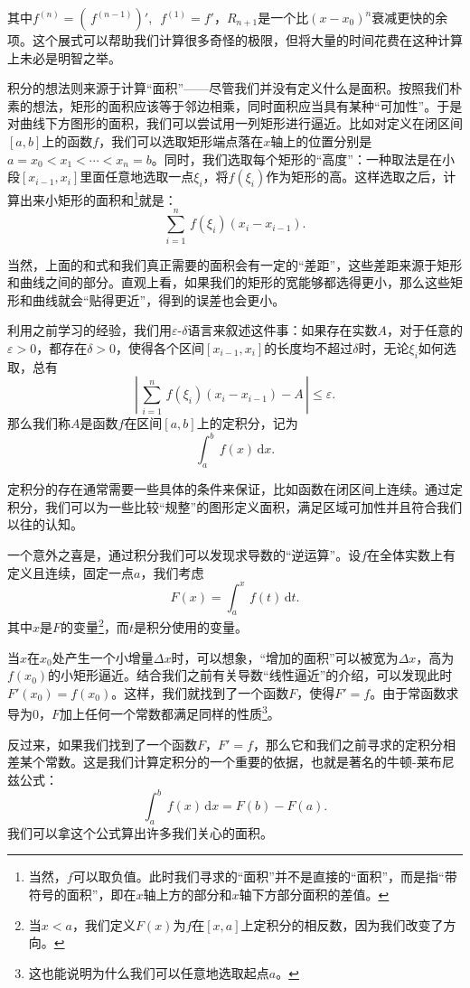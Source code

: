其中$f^{(n)}=\left(\, f^{(n-1)} \right)'$,~$\,f^{(1)}=f'$，$R_{n+1}$是一个比$(x-x_0)^n$衰减更快的余项。这个展式可以帮助我们计算很多奇怪的极限，但将大量的时间花费在这种计算上未必是明智之举。


积分的想法则来源于计算“面积”——尽管我们并没有定义什么是面积。按照我们朴素的想法，矩形的面积应该等于邻边相乘，同时面积应当具有某种“可加性”。于是对曲线下方图形的面积，我们可以尝试用一列矩形进行逼近。比如对定义在闭区间$[a,b]$上的函数$f$，我们可以选取矩形端点落在$x$轴上的位置分别是$a=x_0<x_1<\cdots  <x_n=b$。同时，我们选取每个矩形的“高度”：一种取法是在小段$[x_{i-1},x_{i}]$里面任意地选取一点$\xi_i$，将$f(\xi_i)$作为矩形的高。这样选取之后，计算出来小矩形的面积和\footnote{当然，$f$可以取负值。此时我们寻求的“面积”并不是直接的“面积”，而是指“带符号的面积”，即在$x$轴上方的部分和$x$轴下方部分面积的差值。}就是：
\[\sum_{i=1}^n  \,f(\xi_i)(x_i-x_{i-1}).\]

当然，上面的和式和我们真正需要的面积会有一定的“差距”，这些差距来源于矩形和曲线之间的部分。直观上看，如果我们的矩形的宽能够都选得更小，那么这些矩形和曲线就会“贴得更近”，得到的误差也会更小。

利用之前学习的经验，我们用$\varepsilon\text{-}\delta$语言来叙述这件事：如果存在实数$A$，对于任意的$\varepsilon>0$，都存在$\delta>0$，使得各个区间$[x_{i-1},x_i]$的长度均不超过$\delta$时，无论$\xi_i$如何选取，总有
\[\left|\,\sum_{i=1}^n  \,f(\xi_i)(x_i-x_{i-1})-A\,\right|\leqslant  \varepsilon.\]
那么我们称$A$是函数$f$在区间$[a,b]$上的定积分，记为
\[\int_a^{b} \,f(x)\,\mathrm{d}x.\]

定积分的存在通常需要一些具体的条件来保证，比如函数在闭区间上连续。通过定积分，我们可以为一些比较“规整”的图形定义面积，满足区域可加性并且符合我们以往的认知。

一个意外之喜是，通过积分我们可以发现求导数的“逆运算”。设$f$在全体实数上有定义且连续，固定一点$a$，我们考虑
\[F(x)=\int_{a}^x\,f(t)\,\mathrm{d}t.\]
其中$x$是$F$的变量\footnote{当$x<a$，我们定义$F(x)$为$f$在$[x,a]$上定积分的相反数，因为我们改变了方向。}，而$t$是积分使用的变量。

当$x$在$x_0$处产生一个小增量$\Delta x$时，可以想象，“增加的面积”可以被宽为$\Delta x$，高为$f(x_0)$的小矩形逼近。结合我们之前有关导数“线性逼近”的介绍，可以发现此时$F'(x_0)=f(x_0)$。这样，我们就找到了一个函数$F$，使得$F'=f$。由于常函数求导为$0$，$F$加上任何一个常数都满足同样的性质\footnote{这也能说明为什么我们可以任意地选取起点$a$。}。

反过来，如果我们找到了一个函数$F$，$F'=f$，那么它和我们之前寻求的定积分相差某个常数。这是我们计算定积分的一个重要的依据，也就是著名的牛顿-莱布尼兹公式：
\[\int_a^b\,f(x)\,\mathrm{d}x=F(b)-F(a).\]
我们可以拿这个公式算出许多我们关心的面积。

